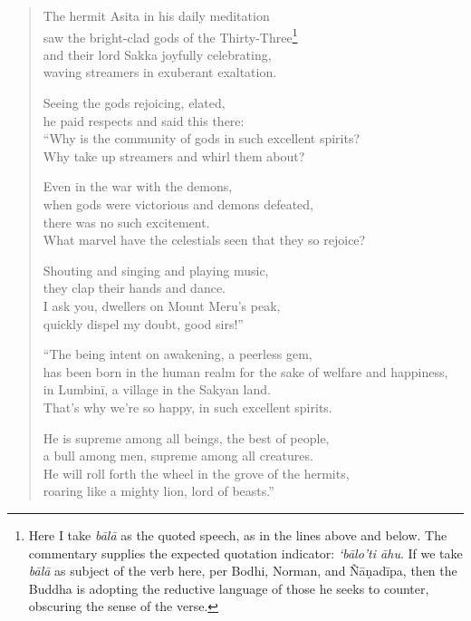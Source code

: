 \documentclass[12pt,openany]{book}%
\begin{document}
\begin{verse}%
The hermit Asita in his daily meditation \\
saw the bright-clad gods of the Thirty-Three\footnote{Here I take \textit{\textsanskrit{bālā}} as the quoted speech, as in the lines above and below. The commentary supplies the expected quotation indicator: \textit{‘\textsanskrit{bālo}’ti \textsanskrit{āhu}}. If we take \textit{\textsanskrit{bālā}} as subject of the verb here, per Bodhi, Norman, and \textsanskrit{Ñāṇadīpa}, then the Buddha is adopting the reductive language of those he seeks to counter, obscuring the sense of the verse. } \\
and their lord Sakka joyfully celebrating, \\
waving streamers in exuberant exaltation. 

Seeing the gods rejoicing, elated, \\
he paid respects and said this there: \\
“Why is the community of gods in such excellent spirits? \\
Why take up streamers and whirl them about? 

Even in the war with the demons, \\
when gods were victorious and demons defeated, \\
there was no such excitement. \\
What marvel have the celestials seen that they so rejoice? 

Shouting and singing and playing music, \\
they clap their hands and dance. \\
I ask you, dwellers on Mount Meru’s peak, \\
quickly dispel my doubt, good sirs!” 

“The being intent on awakening, a peerless gem, \\
has been born in the human realm for the sake of welfare and happiness, \\
in \textsanskrit{Lumbinī}, a village in the Sakyan land. \\
That’s why we’re so happy, in such excellent spirits. 

He is supreme among all beings, the best of people, \\
a bull among men, supreme among all creatures. \\
He will roll forth the wheel in the grove of the hermits, \\
roaring like a mighty lion, lord of beasts.” 


\end{verse}
\end{document}

